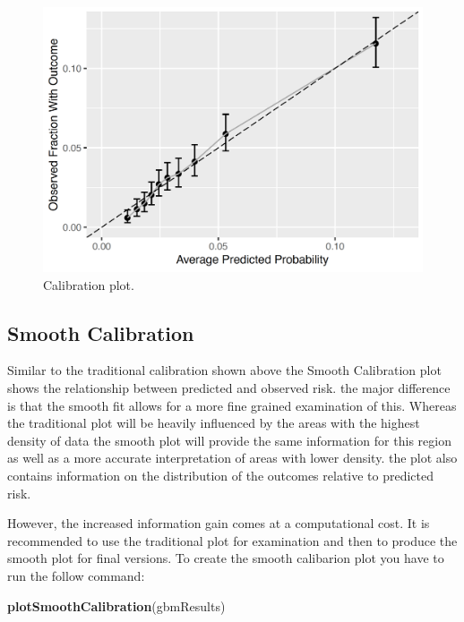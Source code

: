 \documentclass[]{book}
\newenvironment{Shaded}{\begin{snugshade}}{\end{snugshade}}
\newcommand{\KeywordTok}[1]{\textcolor[rgb]{0.13,0.29,0.53}{\textbf{#1}}}
\newcommand{\NormalTok}[1]{#1}
\begin{document}
\begin{figure}

{\centering \includegraphics[width=0.9\linewidth]{images/PatientLevelPrediction/sparseCalibration} 

}

\caption{Calibration plot.}\label{fig:plpCalibration}
\end{figure}

\subsection{Smooth Calibration}\label{smooth-calibration}

Similar to the traditional calibration shown above the Smooth
Calibration plot shows the relationship between predicted and observed
risk. the major difference is that the smooth fit allows for a more fine
grained examination of this. Whereas the traditional plot will be
heavily influenced by the areas with the highest density of data the
smooth plot will provide the same information for this region as well as
a more accurate interpretation of areas with lower density. the plot
also contains information on the distribution of the outcomes relative
to predicted risk.

However, the increased information gain comes at a computational cost.
It is recommended to use the traditional plot for examination and then
to produce the smooth plot for final versions. To create the smooth
calibarion plot you have to run the follow command:

\begin{Shaded}
\begin{Highlighting}[]
\KeywordTok{plotSmoothCalibration}\NormalTok{(gbmResults)}
\end{Highlighting}
\end{Shaded}
\end{document}

